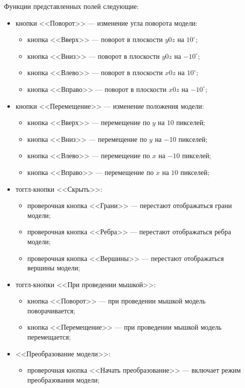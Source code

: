 Функции представленных полей следующие:
\begin{itemize}
	\item кнопки <<Поворот>> --- изменение угла поворота модели:
	\begin{itemize}
		\item кнопка <<Вверх>> --- поворот в плоскости $y0z$ на $10^{\circ}$;
		\item кнопка <<Вниз>> --- поворот в плоскости $y0z$ на $-10^{\circ}$;
		\item кнопка <<Влево>> --- поворот в плоскости $x0z$ на $10^{\circ}$;
		\item кнопка <<Вправо>> --- поворот в плоскости $x0z$ на $-10^{\circ}$;
	\end{itemize}
	\item кнопки <<Перемещение>> --- изменение положения модели:
	\begin{itemize}
		\item кнопка <<Вверх>> --- перемещение по $y$ на $10$ пикселей;
		\item кнопка <<Вниз>> --- перемещение по $y$ на $-10$ пикселей;
		\item кнопка <<Влево>> --- перемещение по $x$ на $-10$ пикселей;
		\item кнопка <<Вправо>> --- перемещение по $x$ на $10$ пикселей;
	\end{itemize}
	\item тоггл-кнопки <<Скрыть>>:
	\begin{itemize}
		\item проверочная кнопка <<Грани>> --- перестают отображаться грани модели;
		\item проверочная кнопка <<Ребра>> --- перестают отображаться ребра модели;
		\item проверочная кнопка <<Вершины>> --- перестают отображаться вершины модели;
	\end{itemize}
	\item тоггл-кнопки <<При проведении мышкой>>:
	\begin{itemize}
		\item кнопка <<Поворот>> --- при проведении мышкой модель поворачивается;
		\item кнопка <<Перемещение>> --- при проведении мышкой модель перемещается;
	\end{itemize}
	\item <<Преобразование модели>>:
	\begin{itemize}
		\item проверочная кнопка <<Начать преобразование>> --- включает режим преобразования модели;

\end{itemize}
\end{itemize}
